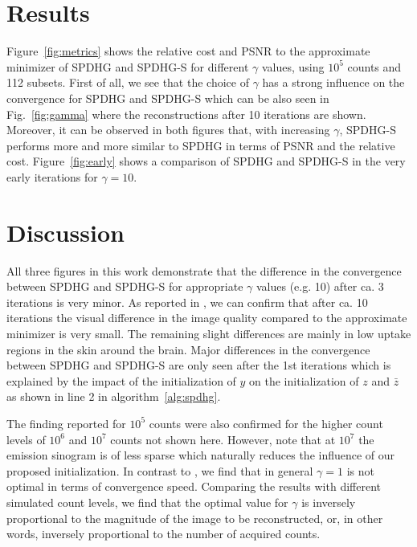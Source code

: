 \documentclass[11pt,twocolumn,twoside]{article}
\begin{document}


\section{Results}

Figure~\ref{fig:metrics} shows the relative cost and PSNR to the approximate minimizer of 
SPDHG and SPDHG-S for different $\gamma$ values, using $10^5$ counts and 112 subsets.
First of all, we see that the choice of $\gamma$ has a strong influence on the convergence for
SPDHG and SPDHG-S which can be also seen in Fig.~\ref{fig:gamma} where the reconstructions
after 10 iterations are shown. 
Moreover, it can be observed in both figures that, 
with increasing $\gamma$, SPDHG-S performs more and more similar to SPDHG in terms 
of PSNR and the relative cost.
Figure~\ref{fig:early} shows a comparison of SPDHG and SPDHG-S in the very early iterations
for $\gamma = 10$.

\section{Discussion}

All three figures in this work demonstrate that the difference in the convergence between 
SPDHG and SPDHG-S for appropriate $\gamma$ values (e.g. 10) after ca. 3 iterations is very minor.
As reported in \cite{Ehrhardt2019}, we can confirm that after ca. 10 iterations the visual difference
in the image quality compared to the approximate minimizer is very small.
The remaining slight differences are mainly in low uptake regions in the skin around the brain.
Major differences in the convergence between SPDHG and SPDHG-S are only seen after the
1st iterations which is explained by the impact of the initialization of $y$ on the initialization
of $z$ and $\bar{z}$ as shown in line 2 in algorithm~\ref{alg:spdhg}.

The finding reported for $10^5$ counts were also confirmed for the higher count levels 
of $10^6$ and $10^7$ counts not shown here. 
However, note that at $10^7$ the emission sinogram is of less sparse
which naturally reduces the influence of our proposed initialization.
In contrast to \cite{Ehrhardt2019}, we find that in general $\gamma = 1$ is not optimal
in terms of convergence speed. 
Comparing the results with different simulated count levels, we find that the optimal value
for $\gamma$ is inversely proportional to the magnitude of the image to be reconstructed, or, 
in other words, inversely proportional to the number of acquired counts.
\end{document}
